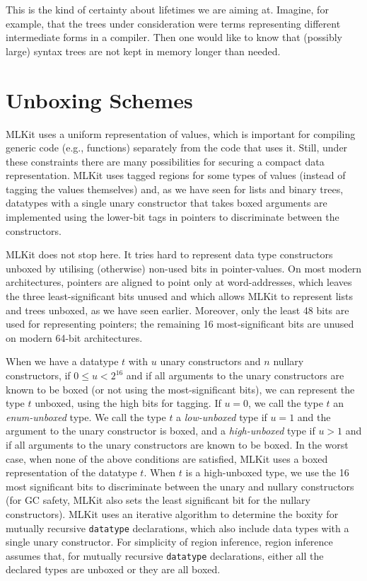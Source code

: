 \documentclass[12pt]{book}
\begin{document}
This is the kind of certainty about lifetimes we are aiming at.  Imagine, for
example, that the trees under consideration were terms representing different
intermediate forms in a compiler. Then one would like to know that (possibly
large) syntax trees are not kept in memory longer than needed.

\section{Unboxing Schemes}
\label{unboxing.sec}

%
%

MLKit uses a uniform representation of values, which is important for
compiling generic code (e.g., functions) separately from the code that uses
it. Still, under these constraints there are many possibilities for securing a
compact data representation. MLKit uses tagged regions for some types of
values (instead of tagging the values themselves) and, as we have seen for lists
and binary trees, datatypes with a single unary constructor that takes boxed
arguments are implemented using the lower-bit tags in pointers to discriminate
between the constructors.

MLKit does not stop here.
%
%
%
It tries hard to represent data type constructors unboxed by utilising
(otherwise) non-used bits in pointer-values. On most modern architectures,
pointers are aligned to point only at word-addresses, which leaves the three
least-significant bits unused and which allows MLKit to represent lists and
trees unboxed, as we have seen earlier. Moreover, only the least 48 bits are
used for representing pointers; the remaining 16 most-significant bits are
unused on modern 64-bit architectures.

When we have a datatype $t$ with $u$ unary constructors and $n$ nullary
constructors, if $0 \leq u < 2^{16}$ and if all arguments to the unary
constructors are known to be boxed (or not using the most-significant bits), we
can represent the type $t$ unboxed, using the high bits for tagging. If $u = 0$,
we call the type $t$ an
%
%
%
%
\emph{enum-unboxed} type. We call the type $t$ a
%
%
%
%
\emph{low-unboxed} type if $u = 1$ and the argument to the unary constructor is
boxed, and a
%
%
%
%
\emph{high-unboxed} type if $u > 1$ and if all arguments to the unary
constructors are known to be boxed. In the worst case, when none of the above
conditions are satisfied, MLKit uses a boxed representation of the datatype
$t$. When $t$ is a high-unboxed type, we use the 16 most significant bits to
discriminate between the unary and nullary constructors (for GC safety, MLKit
also sets the least significant bit for the nullary constructors). MLKit uses an
iterative algorithm to determine the boxity for mutually recursive
\lstinline{datatype} declarations, which also include data types with a single
unary constructor. For simplicity of region inference, region inference assumes
that, for mutually recursive \lstinline{datatype} declarations, either all the
declared types are unboxed or they are all boxed.
\end{document}
